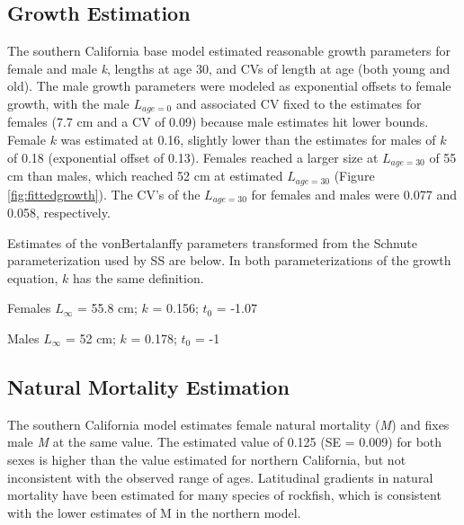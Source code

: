 \documentclass[
  english,
  a4paper,
]{article}
\begin{document}
\hypertarget{growth-estimation}{%
\subsection{Growth Estimation}\label{growth-estimation}}

The southern California base model estimated reasonable growth parameters for female and male \emph{k}, lengths at age 30, and CVs of length at age (both young and old). The male growth parameters were modeled as exponential offsets to female growth, with the male \(L_{age=0}\) and associated CV fixed to the estimates for females (7.7 cm and a CV of 0.09) because male estimates hit lower bounds. Female \(k\) was estimated at 0.16, slightly lower than the estimates for males of \(k\) of 0.18 (exponential offset of 0.13). Females reached a larger size at \(L_{age=30}\) of 55 cm than males, which reached 52 cm at estimated \(L_{age=30}\) (Figure \ref{fig:fittedgrowth}). The CV's of the \(L_{age=30}\) for females and males were 0.077 and 0.058, respectively.

Estimates of the vonBertalanffy parameters transformed from the Schnute parameterization used by SS are below. In both parameterizations of the growth equation, \(k\) has the same definition.

\begin{centering}

Females $L_{\infty}$ = 55.8 cm; $k$ = 0.156; $t_0$ = -1.07

Males $L_{\infty}$ = 52 cm; $k$ = 0.178; $t_0$ = -1

\end{centering}

\vspace{0.5cm}

\hypertarget{natural-mortality-estimation}{%
\subsection{Natural Mortality Estimation}\label{natural-mortality-estimation}}

The southern California model estimates female natural mortality (\emph{M}) and fixes male \emph{M} at the same value. The estimated value of 0.125 (SE = 0.009) for both sexes is higher than the value estimated for northern California, but not inconsistent with the observed range of ages. Latitudinal gradients in natural mortality have been estimated for many species of rockfish, which is consistent with the lower estimates of M in the northern model.
\end{document}
